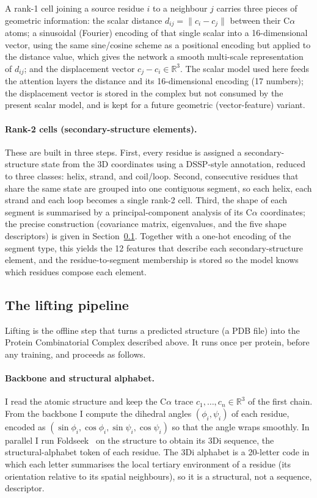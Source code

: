 \documentclass[11pt,a4paper]{article}
\theoremstyle{definition}
\begin{document}
A rank-1 cell joining a source residue $i$ to a neighbour $j$ carries three
pieces of geometric information: the scalar distance $d_{ij}=\lVert c_i-c_j\rVert$
between their C$\alpha$ atoms; a sinusoidal (Fourier) encoding of that single
scalar into a 16-dimensional vector, using the same sine/cosine scheme as a
positional encoding but applied to the distance value, which gives the network a
smooth multi-scale representation of $d_{ij}$; and the displacement vector
$c_j-c_i\in\mathbb{R}^3$. The scalar model used here feeds the attention layers
the distance and its 16-dimensional encoding (17 numbers); the displacement
vector is stored in the complex but not consumed by the present scalar model,
and is kept for a future geometric (vector-feature) variant.

\paragraph{Rank-2 cells (secondary-structure elements).} These are built in three
steps. First, every residue is assigned a secondary-structure state from the 3D
coordinates using a DSSP-style annotation, reduced to three classes: helix,
strand, and coil/loop. Second, consecutive residues that share the same state are
grouped into one contiguous segment, so each helix, each strand and each loop
becomes a single rank-2 cell. Third, the shape of each segment is summarised by a
principal-component analysis of its C$\alpha$ coordinates; the precise
construction (covariance matrix, eigenvalues, and the five shape descriptors) is
given in Section~\ref{sec:lifting}. Together with a one-hot encoding of the
segment type, this yields the 12 features that describe each secondary-structure
element, and the residue-to-segment membership is stored so the model knows which
residues compose each element.

\subsection{The lifting pipeline}
\label{sec:lifting}

Lifting is the offline step that turns a predicted structure (a PDB file) into the
Protein Combinatorial Complex described above. It runs once per protein, before
any training, and proceeds as follows.

\paragraph{Backbone and structural alphabet.} I read the atomic structure and keep
the C$\alpha$ trace $c_1,\dots,c_n\in\mathbb{R}^3$ of the first chain. From the
backbone I compute the dihedral angles $(\phi_i,\psi_i)$ of each residue, encoded
as $(\sin\phi_i,\cos\phi_i,\sin\psi_i,\cos\psi_i)$ so that the angle wraps
smoothly. In parallel I run Foldseek~\cite{foldseek} on the structure to obtain
its 3Di sequence, the structural-alphabet token of each residue. The 3Di alphabet
is a 20-letter code in which each letter summarises the local tertiary
environment of a residue (its orientation relative to its spatial neighbours), so
it is a structural, not a sequence, descriptor.
\end{document}
